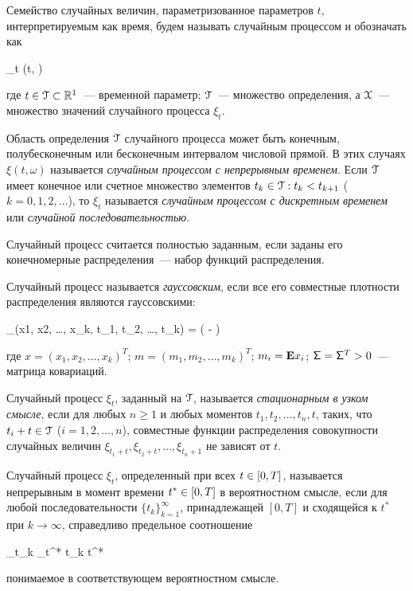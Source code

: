 \begin{df}
    Семейство случайных величин, параметризованное параметров $t$, интерпретируемым как время, будем называть случайным процессом и обозначать как
    
    \beqn
    	\xi_t \eqdef \xi(t, \omega) \in \setX \subset {} \text{,}
    \eeqn

    где $t \in \mathcal{T} \subset \mathbb{R}^{1}$~--- временной параметр; $\mathcal{T}$~--- множество определения, а $\mathcal{X}$~--- множество значений случайного процесса $\xi_t$.
\end{df}

Область определения $\mathcal{T}$ случайного процесса может быть конечным, полубесконечным или бесконечным интервалом числовой прямой. В этих случаях $\xi(t, \omega)$ называется \emph{случайным процессом с непрерывным временем}. Если $\mathcal{T}$ имеет конечное или счетное множество элементов $t_k \in \mathcal{T}: t_k < t_{k+1}$ ($k = 0, 1, 2, \ldots$), то $\xi_t$ называется \emph{случайным процессом с дискретным временем} или \emph{случайной последовательностью}.

Случайный процесс считается полностью заданным, если заданы его конечномерные распределения~--- набор функций распределения.

Случайный процесс называется \emph{гауссовским}, если все его совместные плотности распределения являются гауссовскими:

\beqn
	\prob_\xi(x1, x2, \ldots, x_k, t_1, t_2, \ldots, t_k) = \exp\biggl( - \biggr) \text{,}
\eeqn

где $x = (x_1, x_2, \ldots, x_k)^T$; $m = (m_1, m_2, \ldots, m_k)^T$; $m_i = \mathbf{E} x_i$; $\mathsf{\Sigma} = \mathsf{\Sigma}^T > 0$~--- матрица ковариаций.

Случайный процесс $\xi_t$, заданный на $\mathcal{T}$, называется \emph{стационарным в узком смысле}, если для любых $n \geqslant 1$ и любых моментов $t_1, t_2, \ldots, t_n, t$, таких, что $t_i + t \in \mathcal{T}$ ($i = 1, 2, \ldots, n$), совместные функции распределения совокупности случайных величин $\xi_{t_1+t}, \xi_{t_2+t}, \ldots, \xi_{t_n+1}$ не зависят от $t$.

\begin{df}
	Случайный процесс $\xi_t$, определенный при всех $t \in [0, T]$, называется непрерывным в момент времени $t^{*} \in [0, T]$ в вероятностном смысле, если для любой последовательности $\{t_k\}_{k=1}^\infty$, принадлежащей $[0, T]$ и сходящейся к $t^{*}$ при $k \to \infty$, справедливо предельное соотношение
	
	\beqn
		\xi_{t_k} \to \xi_{t^{*}}  t_k \to t^{*}  \text{,}
	\eeqn
	
	понимаемое в соответствующем вероятностном смысле.
\end{df}

